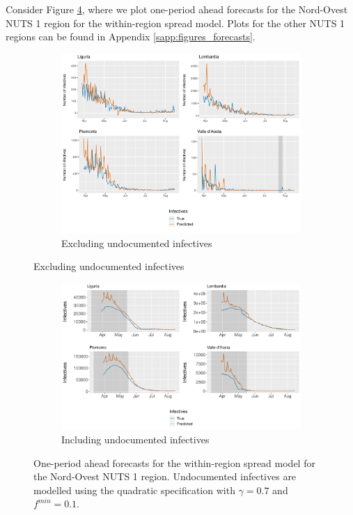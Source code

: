 \documentclass[12pt]{article}
\begin{document}
	Consider Figure \ref{fig:forecast_within_nordovest}, where we plot one-period ahead forecasts for the Nord-Ovest NUTS 1 region for the within-region spread model. Plots for the other NUTS 1 regions can be found in Appendix \ref{sapp:figures_forecasts}.
	
	\begin{figure}[H]
	    \centering
	    \begin{subfigure}{\textwidth}
	      \centering
	      \includegraphics[width=0.94\linewidth]{output/model_within_lag14_forecast_start20_Nord-Ovest_rolling.pdf}
	      \caption{Excluding undocumented infectives}
	      \label{fig:forecast_within_nordovest_regular}
	    \end{subfigure}
    \end{figure}
    \begin{figure}[H]\ContinuedFloat
	    \begin{subfigure}{\textwidth}
	      \centering
	      \includegraphics[width=0.94\linewidth]{output/model_within_lag14_forecast_start20_Nord-Ovest_UndocQuadratic_rolling.pdf}
	      \caption{Including undocumented infectives}
	      \label{fig:forecast_within_nordovest_undoc}
	    \end{subfigure}
	    \caption{One-period ahead forecasts for the within-region spread model for the Nord-Ovest NUTS 1 region. Undocumented infectives are modelled using the quadratic specification with $\gamma = 0.7$ and $f^{min}=0.1$.}
	    \label{fig:forecast_within_nordovest}
    \end{figure}
	
\end{document}
